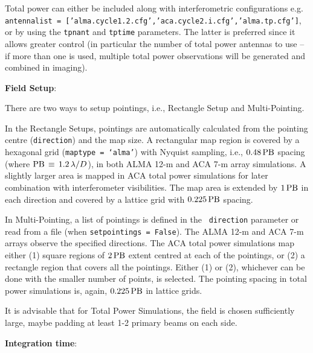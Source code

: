 Total power can either be included along with interferometric configurations e.g.  {\tt antennalist = ['alma.cycle1.2.cfg','aca.cycle2.i.cfg','alma.tp.cfg']}, 
or by using the {\tt tpnant} and {\tt tptime} parameters.  The latter is preferred since it allows greater control (in particular the number of total power antennas to use -- if more than one is used, multiple total power observations will be generated and combined in imaging).


\medskip
{\bf Field Setup}:

There are two ways to setup pointings, i.e., Rectangle Setup and
Multi-Pointing.

In the Rectangle Setups, pointings are automatically calculated from
the pointing centre ({\tt direction}) and the map size.  A rectangular
map region is covered by a hexagonal grid ({\tt maptype = `alma'})
with Nyquist sampling, i.e., $ 0.48\, {\rm PB} $ spacing (where $ {\rm
  PB} \, \equiv \, 1.2 \, \lambda / D $), in both ALMA 12-m and ACA
7-m array simulations.  A slightly larger area is mapped in ACA total
power simulations for later combination with interferometer
visibilities. The map area is extended by $ 1 \, {\rm PB} $ in each
direction and covered by a lattice grid with $ 0.225\, {\rm PB} $
spacing.

In Multi-Pointing, a list of pointings is defined in the {\tt
  direction} parameter or read from a file (when {\tt setpointings =
  False}). The ALMA 12-m and ACA 7-m arrays observe the specified
directions.  The ACA total power simulations map either (1) square
regions of $ 2\, {\rm PB} $ extent centred at each of the pointings,
or (2) a rectangle region that covers all the pointings.  Either (1)
or (2), whichever can be done with the smaller number of points, is
selected. The pointing spacing in total power simulations is, again, $
0.225\, {\rm PB} $ in lattice grids.


It is advisable that for Total Power Simulations, the field is chosen
sufficiently large, maybe padding at least 1-2 primary beams on each
side.



\medskip
{\bf Integration time}:

